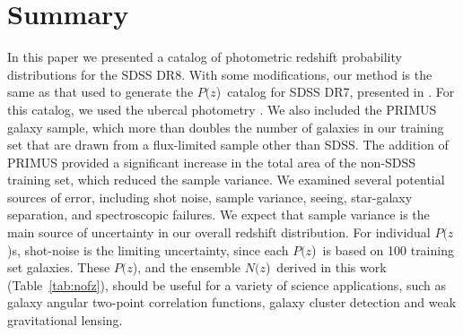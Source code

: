 \documentclass[preprint]{aastex}
\newcommand{\pofz}{$P(z$)}
\newcommand{\nofz}{$N(z$)}
\begin{document}
\section{Summary} \label{sec:summary}

In this paper we presented a catalog of photometric redshift probability
distributions for the SDSS DR8.  With some modifications, our method is the
same as that used to generate the \pofz\ catalog for SDSS DR7, presented in
\cite{CunhaPhotoz09}.  For this catalog, we used the ubercal photometry
\citep{Nikhil08}.  We also included the PRIMUS galaxy sample, which more than
doubles the number of galaxies in our training set that are drawn from a
flux-limited sample other than SDSS.  The addition of PRIMUS provided a
significant increase in the total area of the non-SDSS training set, which
reduced the sample variance.  We examined several potential sources of error,
including shot noise, sample variance, seeing, star-galaxy separation, and
spectroscopic failures.  We expect that sample variance is the main source of
uncertainty in our overall redshift distribution.  For individual \pofz s,
shot-noise is the limiting uncertainty, since each \pofz\ is based on 100
training set galaxies.  These \pofz, and the ensemble \nofz\ derived in this
work (Table~\ref{tab:nofz}), should be useful for a variety of science
applications, such as galaxy angular two-point correlation functions, galaxy
cluster detection and weak gravitational lensing.
\end{document}
